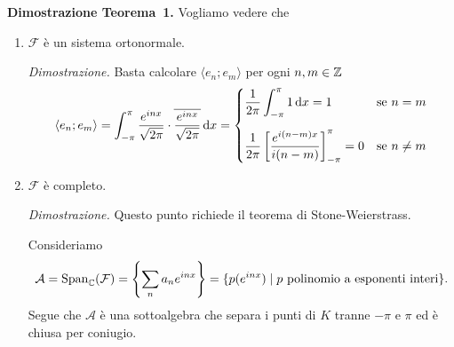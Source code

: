 \textbf{Dimostrazione Teorema~1.}
Vogliamo vedere che
\begin{enumerate}
	\item $\mathcal F$ è un sistema ortonormale.

		\textit{Dimostrazione.}
		Basta calcolare $\langle e_n; e_m \rangle$ per ogni $n, m \in \mathbb Z$
		$$
		\langle e_n; e_m \rangle
		= \int_{-\pi}^\pi \frac{e^{inx}}{\sqrt{2\pi}} \cdot \overline{\frac{e^{inx}}{\sqrt{2\pi}}} \,\mathrm{d} x
		=
		\begin{cases}
			\displaystyle \frac{1}{2\pi} \int_{-\pi}^\pi 1 \,\mathrm{d} x = 1 & \text{se } n = m \\[15pt]
			\displaystyle \frac{1}{2\pi} \left[ \frac{e^{i(n - m)x}}{i(n - m)} \right]_{-\pi}^\pi = 0& \text{se } n \neq m \\
		\end{cases}
		$$

	\item $\mathcal F$ è completo.

		\textit{Dimostrazione.} Questo punto richiede il teorema di Stone-Weierstrass.

		Consideriamo
		$$
			\mathcal A = \operatorname{Span}_\mathbb C(\mathcal F) = \left\{ \sum_n a_n e^{inx} \right\} = \{ p(e^{inx}) \mid p \text{ polinomio a esponenti interi} \}.
		$$
		Segue che $\mathcal A$ è una sottoalgebra che separa i punti di $K$ tranne $-\pi$ e $\pi$ ed è chiusa per coniugio.





\end{enumerate}
